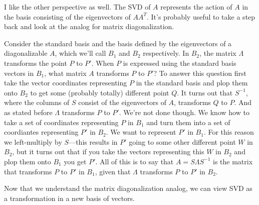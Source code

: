 \documentclass{article}
\begin{document}
I like the other perspective as well. The SVD of $A$ represents the action of $A$ in the basis consisting
of the eigenvectors of $AA^T$. It's probably useful to take a step back and look at the analog for 
matrix diagonalization.

\begin{tcolorbox}[colback=gray!5!white,colframe=gray!75!black,title=Matrix Diagonalization Analog]
  Consider the standard basis and the basis defined by the eigenvectors of a diagonalizable $A$, which
  we'll call $B_1$ and $B_2$ respectively. In $B_2$, the matrix $\Lambda$ transforms the point $P$
  to $P'$. When $P$ is expressed using the standard basis vectors in $B_1$, what matrix $A$ transforms
  $P$ to $P'$?
  \medskip
  \newline
  To answer this question first take the vector coordinates representing $P$ in the standard basis and plop
  them onto $B_2$ to get some (probably totally) different point $Q$. It turns out that $S^{-1}$, where
  the columns of $S$ consist of the eigenvectors of $A$, transforms $Q$ to $P$. And as stated before
  $\Lambda$ transforms $P$ to $P'$.
  \medskip
  \newline
  We're not done though. We know how to take a set of coordinates representing $P$ in $B_1$ and turn 
  them into a set of coordiantes representing $P'$ in $B_2$. We want to represent $P'$ in $B_1$. For
  this reason we left-multiply by $S$---this results in $P'$ going to some other different point $W$ 
  in $B_2$, but it turns out that if you take the vectors representing this $W$ in $B_2$ and plop
  them onto $B_1$ you get $P'$. 
  \medskip
  \newline
  All of this is to say that $A = S \Lambda S^{-1}$ is the matrix that transforms $P$ to $P'$ in $B_1$,
  given that $\Lambda$ transforms $P$ to $P'$ in $B_2$.
\end{tcolorbox}

Now that we understand the matrix diagonalization analog, we can view SVD as a transformation in a new 
basis of vectors.
\end{document}

